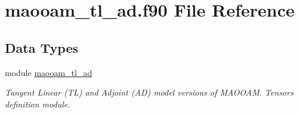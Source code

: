 \hypertarget{maooam__tl__ad_8f90}{\section{maooam\-\_\-tl\-\_\-ad.\-f90 File Reference}
\label{maooam__tl__ad_8f90}
}
\subsection*{Data Types}
\begin{DoxyCompactItemize}
\item 
module \hyperlink{classmaooam__tl__ad}{maooam\-\_\-tl\-\_\-ad}
\begin{DoxyCompactList}\small\item\em Tangent Linear (T\-L) and Adjoint (A\-D) model versions of M\-A\-O\-O\-A\-M. Tensors definition module. \end{DoxyCompactList}\end{DoxyCompactItemize}
